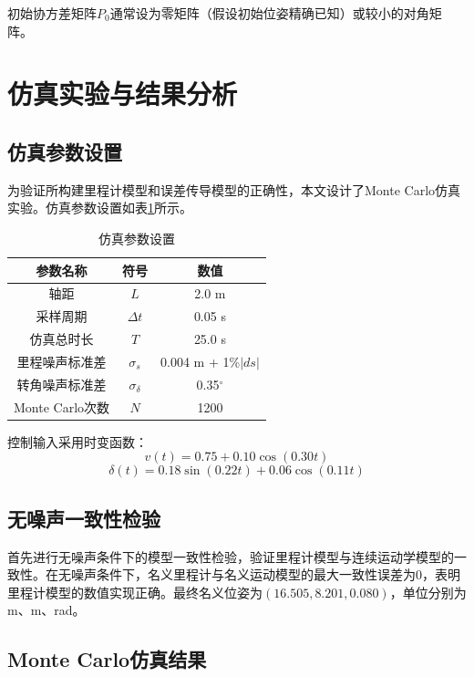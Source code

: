 \documentclass[12pt,a4paper]{article}
\begin{document}
初始协方差矩阵$P_0$通常设为零矩阵（假设初始位姿精确已知）或较小的对角矩阵。

\section{仿真实验与结果分析}

\subsection{仿真参数设置}

为验证所构建里程计模型和误差传导模型的正确性，本文设计了Monte Carlo仿真实验。仿真参数设置如表\ref{tab:params}所示。

\begin{table}[H]
\centering
\caption{仿真参数设置}
\label{tab:params}
\begin{tabular}{ccc}
\toprule
参数名称 & 符号 & 数值 \\
\midrule
轴距 & $L$ & 2.0 m \\
采样周期 & $\Delta t$ & 0.05 s \\
仿真总时长 & $T$ & 25.0 s \\
里程噪声标准差 & $\sigma_s$ & 0.004 m + 1\%$|ds|$ \\
转角噪声标准差 & $\sigma_\delta$ & 0.35$^\circ$ \\
Monte Carlo次数 & $N$ & 1200 \\
\bottomrule
\end{tabular}
\end{table}

控制输入采用时变函数：
\begin{equation}
v(t) = 0.75 + 0.10\cos(0.30t)
\end{equation}
\begin{equation}
\delta(t) = 0.18\sin(0.22t) + 0.06\cos(0.11t)
\end{equation}

\subsection{无噪声一致性检验}

首先进行无噪声条件下的模型一致性检验，验证里程计模型与连续运动学模型的一致性。在无噪声条件下，名义里程计与名义运动模型的最大一致性误差为$0$，表明里程计模型的数值实现正确。最终名义位姿为$(16.505, 8.201, 0.080)$，单位分别为m、m、rad。

\subsection{Monte Carlo仿真结果}
\end{document}
